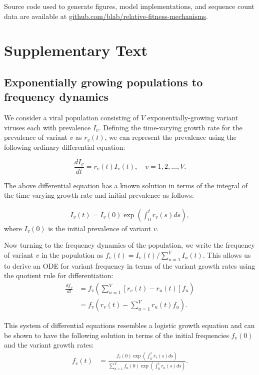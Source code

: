 \documentclass[11pt,oneside,letterpaper]{article}
\begin{document}
Source code used to generate figures, model implementations, and sequence count data are available at \href{https://github.com/blab/relative-fitness-mechanisms}{github.com/blab/relative-fitness-mechanisms}.

\newpage

\section*{Supplementary Text}

\subsection{Exponentially growing populations to frequency dynamics}\label{ssec:frequency_dynamics}

We consider a viral population consisting of $V$ exponentially-growing variant viruses each with prevalence $I_{v}$.
Defining the time-varying growth rate for the prevalence of variant $v$ as $r_{v}(t)$, we can represent the prevalence using the following ordinary differential equation:

\begin{equation} \label{eq:inhomo_exp_growth}
    \frac{d I_{v}}{d t} = r_{v}(t) I_{v}(t), \quad v = 1,2, \ldots, V.
\end{equation}

The above differential equation has a known solution in terms of the integral of the time-varying growth rate and initial prevalence as follows:

\begin{align*}
I_{v}(t) = I_{v}(0) \exp\left( \int_{0}^{t} r_{v}(s) ds\right),
\end{align*}
where $I_{v}(0)$ is the initial prevalence of variant $v$.

Now turning to the frequency dynamics of the population, we write the frequency of variant $v$ in the population as  $f_{v}(t) = I_{v}(t) / \sum_{u=1}^{V} I_{u}(t)$.
This allows us to derive an ODE for variant frequency in terms of the variant growth rates using the quotient rule for differentiation:
\begin{align*}
    \frac{d f_{v}}{d t} &= f_{v} \left( \sum_{u=1}^{V} [r_{v}(t) - r_{u}(t)] f_{u} \right)\\
                        &= f_{v} \left( r_{v}(t) - \sum_{u=1}^{V} r_{u}(t) f_{u} \right).
\end{align*}

This system of differential equations resembles a logistic growth equation and can be shown to have the following solution in terms of the initial frequencies $f_{v}(0)$ and the variant growth rates:
\begin{align}
    f_{v}(t) &= \frac{ f_{v}(0) \exp( \int_{0}^{t} r_{v}(s) ds)}{\sum_{u=1}^{V}  f_{u}(0) \exp( \int_{0}^{t} r_{u}(s) ds)}.
\end{align}
\end{document}

